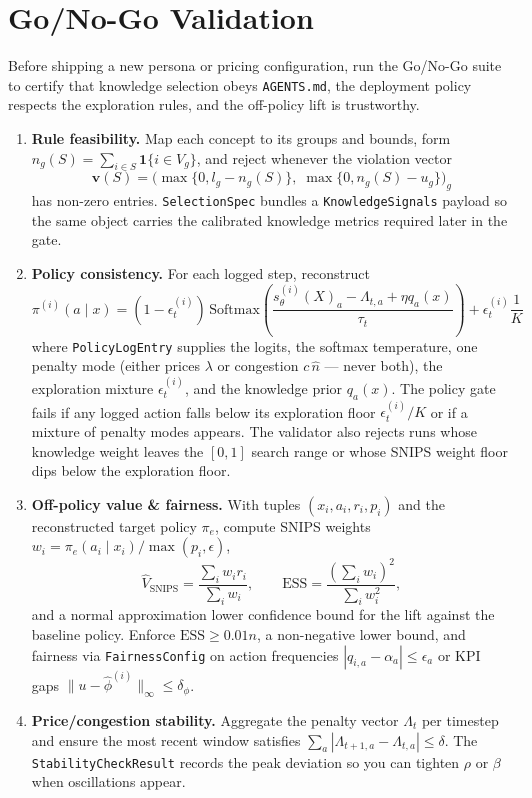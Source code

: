 \documentclass{article}
\begin{document}
\section{Go/No-Go Validation}
Before shipping a new persona or pricing configuration, run the Go/No-Go suite to certify that knowledge selection obeys \texttt{AGENTS.md}, the deployment policy respects the exploration rules, and the off-policy lift is trustworthy.
\begin{enumerate}[leftmargin=*]
  \item \textbf{Rule feasibility.} Map each concept to its groups and bounds, form $n_g(S) = \sum_{i \in S} \mathbf{1}\{i \in V_g\}$, and reject whenever the violation vector
  \[
    \mathbf{v}(S) = \bigl(\max\{0, l_g - n_g(S)\},\; \max\{0, n_g(S) - u_g\}\bigr)_g
  \]
  has non-zero entries. \texttt{SelectionSpec} bundles a \texttt{KnowledgeSignals} payload so the same object carries the calibrated knowledge metrics required later in the gate.
  \item \textbf{Policy consistency.} For each logged step, reconstruct
  \[
    \pi^{(i)}(a \mid x) = (1-\epsilon_t^{(i)})\,\mathrm{Softmax}\!\left(\frac{s_\theta^{(i)}(X)_a - \Lambda_{t,a} + \eta q_a(x)}{\tau_t}\right) + \epsilon_t^{(i)} \frac{1}{K}
  \]
  where \texttt{PolicyLogEntry} supplies the logits, the softmax temperature, one penalty mode (either prices $\lambda$ or congestion $c\,\hat n$ --- never both), the exploration mixture $\epsilon_t^{(i)}$, and the knowledge prior $q_a(x)$. The policy gate fails if any logged action falls below its exploration floor $\epsilon_t^{(i)}/K$ or if a mixture of penalty modes appears. The validator also rejects runs whose knowledge weight leaves the $[0,1]$ search range or whose SNIPS weight floor dips below the exploration floor.
  \item \textbf{Off-policy value \& fairness.} With tuples $(x_i, a_i, r_i, p_i)$ and the reconstructed target policy $\pi_e$, compute SNIPS weights $w_i = \pi_e(a_i \mid x_i)/\max(p_i, \epsilon)$,
  \[
    \widehat{V}_{\mathrm{SNIPS}} = \frac{\sum_i w_i r_i}{\sum_i w_i}, \qquad \mathrm{ESS} = \frac{(\sum_i w_i)^2}{\sum_i w_i^2},
  \]
  and a normal approximation lower confidence bound for the lift against the baseline policy. Enforce $\mathrm{ESS} \ge 0.01 n$, a non-negative lower bound, and fairness via \texttt{FairnessConfig} on action frequencies $|q_{i,a} - \alpha_a| \le \epsilon_a$ or KPI gaps $\|u - \widehat{\phi}^{(i)}\|_\infty \le \delta_\phi$.
  \item \textbf{Price/congestion stability.} Aggregate the penalty vector $\Lambda_t$ per timestep and ensure the most recent window satisfies $\sum_a |\Lambda_{t+1,a} - \Lambda_{t,a}| \le \delta$. The \texttt{StabilityCheckResult} records the peak deviation so you can tighten $\rho$ or $\beta$ when oscillations appear.

\end{enumerate}
\end{document}
